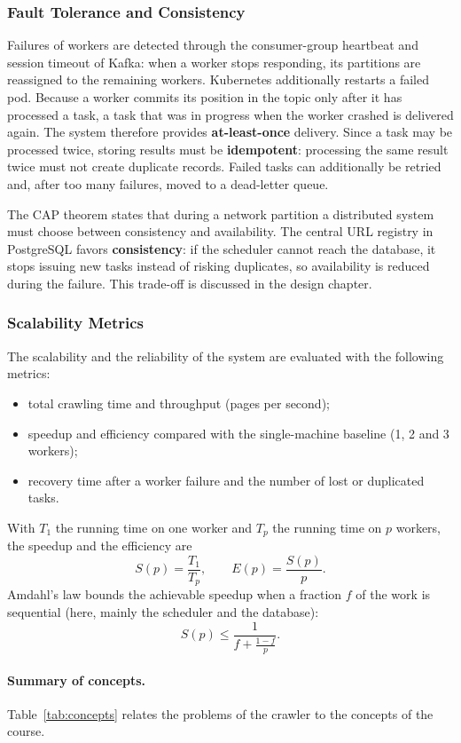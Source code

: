 \subsubsection{Fault Tolerance and Consistency}
Failures of workers are detected through the consumer-group heartbeat and session timeout of Kafka: when a worker stops responding, its partitions are reassigned to the remaining workers. Kubernetes additionally restarts a failed pod. Because a worker commits its position in the topic only after it has processed a task, a task that was in progress when the worker crashed is delivered again. The system therefore provides \textbf{at-least-once} delivery. Since a task may be processed twice, storing results must be \textbf{idempotent}: processing the same result twice must not create duplicate records. Failed tasks can additionally be retried and, after too many failures, moved to a dead-letter queue.

The CAP theorem states that during a network partition a distributed system must choose between consistency and availability. The central URL registry in PostgreSQL favors \textbf{consistency}: if the scheduler cannot reach the database, it stops issuing new tasks instead of risking duplicates, so availability is reduced during the failure. This trade-off is discussed in the design chapter.


\subsubsection{Scalability Metrics}
The scalability and the reliability of the system are evaluated with the following metrics:
\begin{itemize}
    \item total crawling time and throughput (pages per second);
    \item speedup and efficiency compared with the single-machine baseline (1, 2 and 3 workers);
    \item recovery time after a worker failure and the number of lost or duplicated tasks.
\end{itemize}
With $T_1$ the running time on one worker and $T_p$ the running time on $p$ workers, the speedup and the efficiency are
\[
    S(p) = \frac{T_1}{T_p}, \qquad E(p) = \frac{S(p)}{p}.
\]
Amdahl's law bounds the achievable speedup when a fraction $f$ of the work is sequential (here, mainly the scheduler and the database):
\[
    S(p) \le \frac{1}{f + \frac{1-f}{p}}.
\]

\paragraph{Summary of concepts.} Table~\ref{tab:concepts} relates the problems of the crawler to the concepts of the course.

